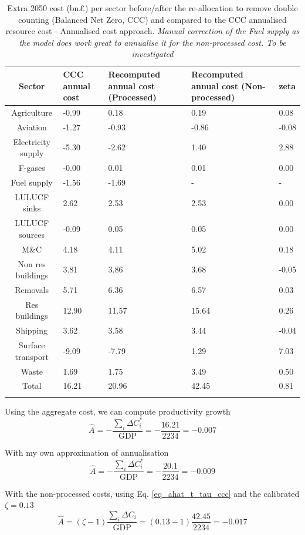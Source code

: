 \documentclass[11pt]{article}
\begin{document}
\begin{longtable}{cP{3cm}P{3cm}P{3cm}P{3cm}}
\caption{Extra 2050 cost (bn£) per sector before/after
the re-allocation to remove double counting (Balanced Net
Zero, CCC) and compared to the CCC annualised resource cost - Annualised cost approach. \footnotesize \textit{Manual correction of the Fuel supply as the model does work great to annualise it for the non-processed cost. To be investigated}} \\ 
  \hline
Sector & CCC annual cost & Recomputed annual cost (Processed) & Recomputed annual cost (Non-processed) & zeta \\ 
  \hline
Agriculture & -0.99 & 0.18 & 0.19 & 0.08 \\ 
  Aviation & -1.27 & -0.93 & -0.86 & -0.08 \\ 
  Electricity supply & -5.30 & -2.62 & 1.40 & 2.88 \\ 
  F-gases & -0.00 & 0.01 & 0.01 & 0.00 \\ 
  Fuel supply & -1.56 & -1.69 & - & - \\ 
  LULUCF sinks & 2.62 & 2.53 & 2.53 & 0.00 \\ 
  LULUCF sources & -0.09 & 0.05 & 0.05 & 0.00 \\ 
  M\&C & 4.18 & 4.11 & 5.02 & 0.18 \\ 
  Non res buildings & 3.81 & 3.86 & 3.68 & -0.05 \\ 
  Removals & 5.71 & 6.36 & 6.57 & 0.03 \\ 
  Res buildings & 12.90 & 11.57 & 15.64 & 0.26 \\ 
  Shipping & 3.62 & 3.58 & 3.44 & -0.04 \\ 
  Surface transport & -9.09 & -7.79 & 1.29 & 7.03 \\ 
  Waste & 1.69 & 1.75 & 3.49 & 0.50 \\ 
   \hline
Total & 16.21 & 20.96 & 42.45 & 0.81 \\ 
  \hline
\label{tab_TFP_annualised_nonprocessed_processed}
\end{longtable}

Using the aggregate cost, we can compute productivity growth
\[
\hat{A}=-\frac{\sum_i \Delta C^*_i}{\text{GDP}}=-\frac{16.21}{2234}=-0.007
\]

With my own approximation of annualisation
\[
\hat{A}=-\frac{\sum_i \Delta C^*_i}{\text{GDP}}=-\frac{20.1}{2234}=-0.009
\]

With the non-processed costs, using  Eq. \eqref{eq_ahat_t_tau_ccc} and the calibrated $\zeta=0.13$
\[
\hat{A}=(\zeta-1)\frac{\sum_i \Delta C_i}{\text{GDP}}=(0.13-1)\frac{42.45}{2234}=-0.017
\]
\end{document}
